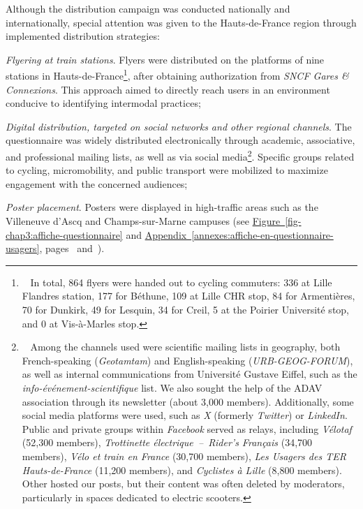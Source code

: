 \begin{refsegment}
Although the distribution campaign was conducted nationally and internationally, special attention was given to the Hauts-de-France region through implemented distribution strategies:
\begin{customitemize}
    \item \textsl{Flyering at train stations}. Flyers were distributed on the platforms of nine stations in Hauts-de-France\footnote{~
        In total, 864 flyers were handed out to cycling commuters: 336 at Lille Flandres station, 177 for Béthune, 109 at Lille CHR stop, 84 for Armentières, 70 for Dunkirk, 49 for Lesquin, 34 for Creil, 5 at the Poirier Université stop, and 0 at Vis-à-Marles stop.
    }, after obtaining authorization from \textsl{SNCF Gares \& Connexions}. This approach aimed to directly reach users in an environment conducive to identifying intermodal practices;
    \item \textsl{Digital distribution, targeted on social networks and other regional channels}. The questionnaire was widely distributed electronically through academic, associative, and professional mailing lists, as well as via social media\footnote{~
        Among the channels used were scientific mailing lists in geography, both French-speaking (\textsl{Geotamtam}) and English-speaking (\textsl{URB-GEOG-FORUM}), as well as internal communications from Université Gustave Eiffel, such as the \textsl{info-événement-scientifique} list. We also sought the help of the \acrfull{ADAV} association through its newsletter (about 3,000 members). Additionally, some social media platforms were used, such as \textsl{X} (formerly \textsl{Twitter}) or \textsl{LinkedIn}. Public and private groups within \textsl{Facebook} served as relays, including \textsl{Vélotaf} (52,300 members), \textsl{Trottinette électrique~–~Rider's Français} (34,700 members), \textsl{Vélo et train en France} (30,700 members), \textsl{Les Usagers des TER Hauts-de-France} (11,200 members), and \textsl{Cyclistes à Lille} (8,800 members). Other  hosted our posts, but their content was often deleted by moderators, particularly in spaces dedicated to electric scooters.
    }. Specific groups related to cycling, micromobility, and public transport were mobilized to maximize engagement with the concerned audiences;
    \item \textsl{Poster placement}. Posters were displayed in high-traffic areas such as the Villeneuve d'Ascq and Champs-sur-Marne campuses (see \hyperref[fig-chap3:affiche-questionnaire]{Figure~\ref{fig-chap3:affiche-questionnaire}} and \hyperref[annexes:affiche-en-questionnaire-usagers]{Appendix~\ref{annexes:affiche-en-questionnaire-usagers}}, pages~\pageref{fig-chap3:affiche-questionnaire} and~\pageref{annexes:affiche-en-questionnaire-usagers}).
\end{customitemize}%


\end{refsegment}
